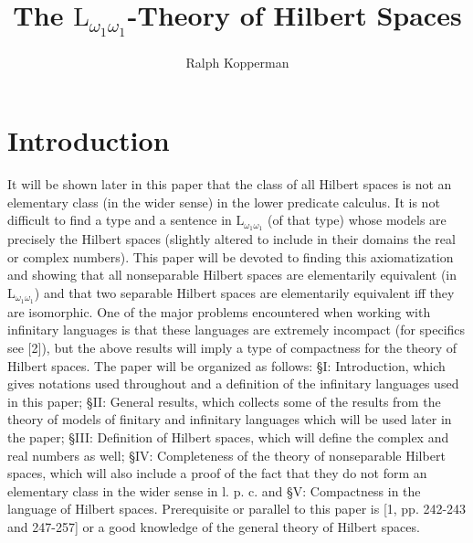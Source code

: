 \documentclass{article}
\title{The $\mathrm{L}_{\omega_1 \omega_1}$-Theory of Hilbert Spaces}
\author{Ralph Kopperman}
\date{}
\begin{document}
\maketitle
\section*{Introduction}
It will be shown later in this paper that the class of all Hilbert spaces is not an elementary class (in the wider sense) in the lower predicate calculus. It is not difficult to find a type and a sentence in $\mathrm{L}_{\omega_1 \omega_1}$ (of that type) whose models are precisely the Hilbert spaces (slightly altered to include in their domains the real or complex numbers).
This paper will be devoted to finding this axiomatization and showing that all nonseparable Hilbert spaces are elementarily equivalent (in $\mathrm{L}_{\omega_1 \omega_1}$) and that two separable Hilbert spaces are elementarily equivalent iff they are isomorphic. One of the major problems encountered when working with infinitary languages is that these languages are extremely incompact (for specifics see [2]), but the above results will imply a type of compactness for the theory of Hilbert spaces.
The paper will be organized as follows: §I: Introduction, which gives notations used throughout and a definition of the infinitary languages used in this paper; §II: General results, which collects some of the results from the theory of models of finitary and infinitary languages which will be used later in the paper; §III: Definition of Hilbert spaces, which will define the complex and real numbers as well; §IV: Completeness of the theory of nonseparable Hilbert spaces, which will also include a proof of the fact that they do not form an elementary class in the wider sense in l. p. c. and §V: Compactness in the language of Hilbert spaces.
Prerequisite or parallel to this paper is [1, pp. 242-243 and 247-257] or a good knowledge of the general theory of Hilbert spaces.
\end{document}
